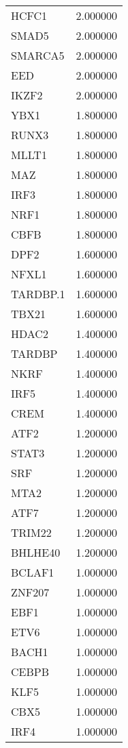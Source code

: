 \begin{longtable}{lr}
           HCFC1 &  2.000000 \\
           SMAD5 &  2.000000 \\
         SMARCA5 &  2.000000 \\
             EED &  2.000000 \\
           IKZF2 &  2.000000 \\
            YBX1 &  1.800000 \\
           RUNX3 &  1.800000 \\
           MLLT1 &  1.800000 \\
             MAZ &  1.800000 \\
            IRF3 &  1.800000 \\
            NRF1 &  1.800000 \\
            CBFB &  1.800000 \\
            DPF2 &  1.600000 \\
           NFXL1 &  1.600000 \\
        TARDBP.1 &  1.600000 \\
           TBX21 &  1.600000 \\
           HDAC2 &  1.400000 \\
          TARDBP &  1.400000 \\
            NKRF &  1.400000 \\
            IRF5 &  1.400000 \\
            CREM &  1.400000 \\
            ATF2 &  1.200000 \\
           STAT3 &  1.200000 \\
             SRF &  1.200000 \\
            MTA2 &  1.200000 \\
            ATF7 &  1.200000 \\
          TRIM22 &  1.200000 \\
         BHLHE40 &  1.200000 \\
          BCLAF1 &  1.000000 \\
          ZNF207 &  1.000000 \\
            EBF1 &  1.000000 \\
            ETV6 &  1.000000 \\
           BACH1 &  1.000000 \\
           CEBPB &  1.000000 \\
            KLF5 &  1.000000 \\
            CBX5 &  1.000000 \\
            IRF4 &  1.000000 \\

\end{longtable}
